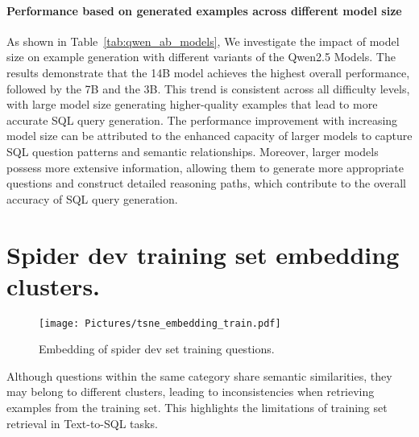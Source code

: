 

\paragraph{Performance based on generated examples across different model size}
As shown in Table~\ref{tab:qwen_ab_models}, We investigate the impact of model size on example generation with different variants of the Qwen2.5 Models. The results demonstrate that the 14B model achieves the highest overall performance, followed by the 7B and the 3B. This trend is consistent across all difficulty levels, with large model size generating higher-quality examples that lead to more accurate SQL query generation. The performance improvement with increasing model size can be attributed to the enhanced capacity of larger models to capture SQL question patterns and semantic relationships. Moreover, larger models possess more extensive information, allowing them to generate more appropriate questions and construct detailed reasoning paths, which contribute to the overall accuracy of SQL query generation.


\section{Spider dev training set embedding clusters.}
\begin{figure}[h]
\centerline{\texttt{[image: Pictures/tsne\_embedding\_train.pdf]}}
\caption{Embedding of spider dev set training questions.}
\vspace{-5mm}
\label{tab:spider_dev_embedding}
\end{figure}
 Although questions within the same category share semantic similarities, they may belong to different clusters, leading to inconsistencies when retrieving examples from the training set. This highlights the limitations of training set retrieval in Text-to-SQL tasks.
 


